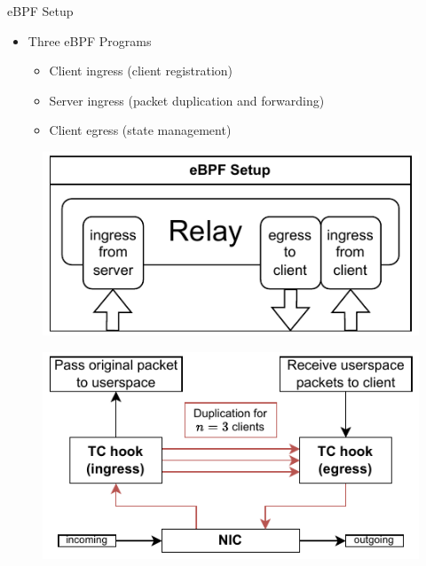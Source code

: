 \documentclass[shortpres,aspectratio=43]{beamer}
\newlength{\mylength}
\begin{document}
\begin{frame}{eBPF Setup}
    \begin{minipage}{0.43\textwidth}
        \begin{itemize}
            \item Three eBPF Programs
            \vspace{2\mylength}
            \begin{itemize}
                \item Client ingress (client registration)
                \vspace{2\mylength}
                \item Server ingress (packet duplication and forwarding)
                \vspace{2\mylength}
                \item Client egress (state management)
            \end{itemize}
        \end{itemize}
    \end{minipage}\hfill
    \begin{minipage}{0.55\textwidth}
        \centering
        \begin{figure}
            \includegraphics[scale=0.6]{../figures/03_fast_relays/ebpf-setup.drawio.pdf}
        \end{figure}
        \vspace{2\mylength}
        \begin{figure}
            \includegraphics[scale=0.7]{../figures/03_fast_relays/packet-forwarding.drawio.pdf}
        \end{figure}
    \end{minipage}
\end{frame}
\end{document}
